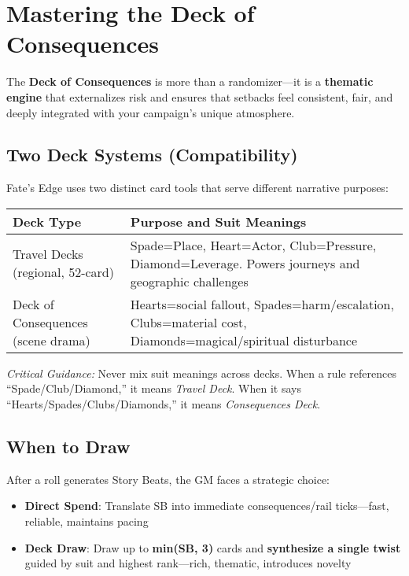 \section*{Mastering the Deck of Consequences}

The \textbf{Deck of Consequences} is more than a randomizer---it is a \textbf{thematic engine} that externalizes risk and ensures that setbacks feel consistent, fair, and deeply integrated with your campaign's unique atmosphere.

\subsection*{Two Deck Systems (Compatibility)}

Fate's Edge uses two distinct card tools that serve different narrative purposes:

\begin{fatebox}
\begin{tabularx}{\textwidth}{lX}
\toprule
\textbf{Deck Type} & \textbf{Purpose and Suit Meanings} \\
\midrule
Travel Decks (regional, 52-card) & Spade=Place, Heart=Actor, Club=Pressure, Diamond=Leverage. Powers journeys and geographic challenges \\
Deck of Consequences (scene drama) & Hearts=social fallout, Spades=harm/escalation, Clubs=material cost, Diamonds=magical/spiritual disturbance \\
\bottomrule
\end{tabularx}
\end{fatebox}

\textit{Critical Guidance:} Never mix suit meanings across decks. When a rule references ``Spade/Club/Diamond,'' it means \emph{Travel Deck}. When it says ``Hearts/Spades/Clubs/Diamonds,'' it means \emph{Consequences Deck}.

\subsection*{When to Draw}

After a roll generates Story Beats, the GM faces a strategic choice:

\begin{itemize}
    \item \textbf{Direct Spend}: Translate SB into immediate consequences/rail ticks—fast, reliable, maintains pacing
    \item \textbf{Deck Draw}: Draw up to \textbf{min(SB, 3)} cards and \textbf{synthesize a single twist} guided by suit and highest rank—rich, thematic, introduces novelty
\end{itemize}

